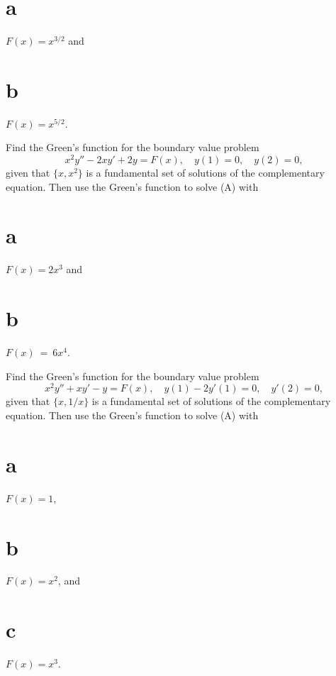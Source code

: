 \begin{exerciselist}
  \part{a} $F(x)=x^{3/2}$ and \part{b} $F(x)=x^{5/2}$.

  \item\label{exer:13.1.24} Find the Green's function for the boundary value problem
  \begin{equation}
    x^{2}y''-2xy'+2y=F(x),\quad y(1)=0,\quad y(2)=0,\tag{A}
  \end{equation}
  given that $\{x,x^{2}\}$ is a fundamental set of solutions of the complementary equation. Then use
  the Green's function to solve (A) with \part{a} $F(x)=2x^{3}$ and \part{b} $F(x)~=~6x^{4}$.

  \item\label{exer:13.1.25} Find the Green's function for the boundary value problem
  \begin{equation}
    x^{2}y''+xy'-y=F(x),\quad y(1)-2y'(1)=0,\quad y'(2)=0,\tag{A}
  \end{equation}
  given that $\{x,1/x\}$ is a fundamental set of solutions of the complementary equation. Then use
  the Green's function to solve (A) with \part{a} $F(x)=1$, \part{b} $F(x)=x^{2}$, and \part{c}
  $F(x)=x^{3}$.



\end{exerciselist}
